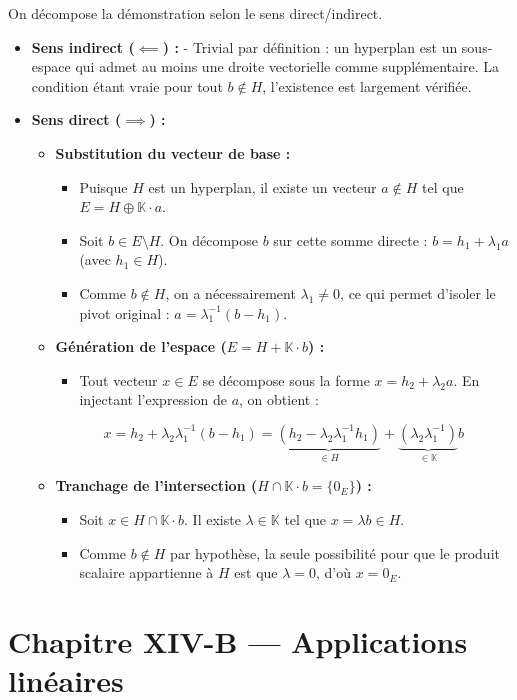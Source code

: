 \documentclass[11pt, a4paper]{article}
\theoremstyle{definition}
\begin{document}
On décompose la démonstration selon le sens direct/indirect.
\begin{itemize}
\item \textbf{Sens indirect ($\impliedby$) :} - Trivial par définition : un hyperplan est un sous-espace qui admet au moins une droite vectorielle comme supplémentaire. La condition étant vraie pour tout $b \notin H$, l'existence est largement vérifiée.
\item \textbf{Sens direct ($\implies$) :}
\begin{itemize}
\item \textbf{Substitution du vecteur de base :}
\begin{itemize}
\item Puisque $H$ est un hyperplan, il existe un vecteur $a \notin H$ tel que $E = H \oplus \mathbb{K} \cdot a$.
\item Soit $b \in E \setminus H$. On décompose $b$ sur cette somme directe : $b = h_1 + \lambda_1 a$ (avec $h_1 \in H$).
\item Comme $b \notin H$, on a nécessairement $\lambda_1 \neq 0$, ce qui permet d'isoler le pivot original : $a = \lambda_1^{-1}(b - h_1)$.
\end{itemize}
\item \textbf{Génération de l'espace ($E = H + \mathbb{K} \cdot b$) :}
\begin{itemize}
\item Tout vecteur $x \in E$ se décompose sous la forme $x = h_2 + \lambda_2 a$. En injectant l'expression de $a$, on obtient :
\end{itemize}
\[
x = h_2 + \lambda_2 \lambda_1^{-1}(b - h_1) = \underbrace{(h_2 - \lambda_2 \lambda_1^{-1} h_1)}_{\in H} + \underbrace{(\lambda_2 \lambda_1^{-1})}_{\in \mathbb{K}} b
\]
\item \textbf{Tranchage de l'intersection ($H \cap \mathbb{K} \cdot b = \{0_E\}$) :}
\begin{itemize}
\item Soit $x \in H \cap \mathbb{K} \cdot b$. Il existe $\lambda \in \mathbb{K}$ tel que $x = \lambda b \in H$.
\item Comme $b \notin H$ par hypothèse, la seule possibilité pour que le produit scalaire appartienne à $H$ est que $\lambda = 0$, d'où $x = 0_E$.
\end{itemize}
\end{itemize}
\end{itemize}

\clearpage

\section{Chapitre XIV-B --- Applications linéaires}
\end{document}
